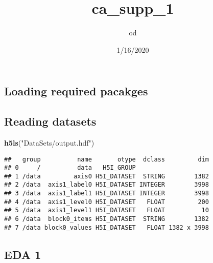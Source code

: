 \documentclass[]{article}
\title{ca\_supp\_1}
\author{od}
\date{1/16/2020}
\newenvironment{Shaded}{\begin{snugshade}}{\end{snugshade}}
\newcommand{\KeywordTok}[1]{\textcolor[rgb]{0.13,0.29,0.53}{\textbf{#1}}}
\newcommand{\NormalTok}[1]{#1}
\newcommand{\StringTok}[1]{\textcolor[rgb]{0.31,0.60,0.02}{#1}}
\begin{document}
\maketitle

\hypertarget{loading-required-pacakges}{%
\subsection{Loading required pacakges}\label{loading-required-pacakges}}

\hypertarget{reading-datasets}{%
\subsection{Reading datasets}\label{reading-datasets}}

\begin{Shaded}
\begin{Highlighting}[]
\KeywordTok{h5ls}\NormalTok{(}\StringTok{"DataSets/output.hdf"}\NormalTok{)}
\end{Highlighting}
\end{Shaded}

\begin{verbatim}
##   group          name       otype  dclass         dim
## 0     /          data   H5I_GROUP                    
## 1 /data         axis0 H5I_DATASET  STRING        1382
## 2 /data  axis1_label0 H5I_DATASET INTEGER        3998
## 3 /data  axis1_label1 H5I_DATASET INTEGER        3998
## 4 /data  axis1_level0 H5I_DATASET   FLOAT         200
## 5 /data  axis1_level1 H5I_DATASET   FLOAT          10
## 6 /data  block0_items H5I_DATASET  STRING        1382
## 7 /data block0_values H5I_DATASET   FLOAT 1382 x 3998
\end{verbatim}

\hypertarget{eda-1}{%
\subsection{EDA 1}\label{eda-1}}
\end{document}

